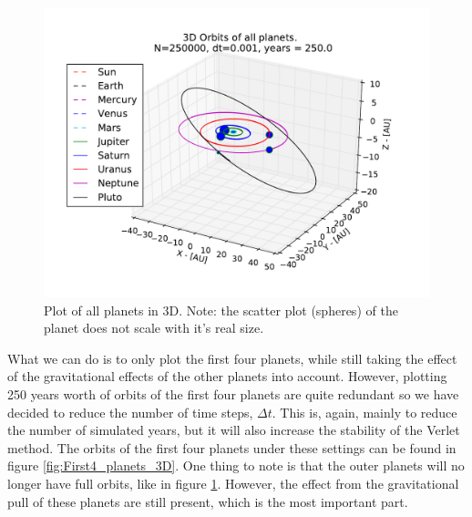 \documentclass[12pt]{article}
\begin{document}
\begin{figure}[!h]
\centering
\includegraphics[width=\linewidth]{Plots/All_planets_3D_plot.pdf}
\caption{Plot of all planets in 3D. Note: the scatter plot (spheres) of the planet does not scale with it's real size.}
\label{fig:All_planets_3D}
\end{figure}
What we can do is to only plot the first four planets, while still taking the effect of the gravitational effects of the other planets into account. However, plotting 250 years worth of orbits of the first four planets are quite redundant so we have decided to reduce the number of time steps, $\Delta t$. This is, again, mainly to reduce the number of simulated years, but it will also increase the stability of the Verlet method. The orbits of the first four planets under these settings can be found in figure \ref{fig:First4_planets_3D}. One thing to note is that the outer planets will no longer have full orbits, like in figure \ref{fig:All_planets_3D}. However, the effect from the gravitational pull of these planets are still present, which is the most important part.

\end{document}
